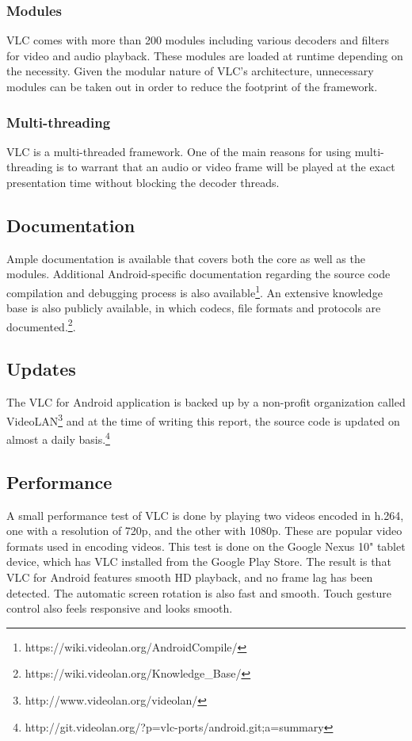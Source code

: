 \subsubsection{Modules}
VLC comes with more than 200 modules including various decoders and filters for video and audio playback. These modules are loaded at runtime depending on the necessity. Given the modular nature of VLC's architecture, unnecessary modules can be taken out in order to reduce the footprint of the framework.
\subsubsection{Multi-threading}
VLC is a multi-threaded framework. One of the main reasons for using multi-threading is to warrant that an audio or video frame will be played at the exact presentation time without blocking the decoder threads.
\subsection{Documentation}
Ample documentation is available that covers both the core as well as the modules. Additional Android-specific documentation regarding the source code compilation and debugging process is also available\footnote{https://wiki.videolan.org/AndroidCompile/}. An extensive knowledge base is also publicly available, in which codecs, file formats and protocols are documented.\footnote{https://wiki.videolan.org/Knowledge\_Base/}.
\subsection{Updates}
The VLC for Android application is backed up by a non-profit organization called VideoLAN\footnote{http://www.videolan.org/videolan/} and at the time of writing this report, the source code is updated on almost a daily basis.\footnote{http://git.videolan.org/?p=vlc-ports/android.git;a=summary}
\subsection{Performance}
\label{sec:VLC_performance}
A small performance test of VLC is done by playing two videos encoded in h.264, one with a resolution of 720p, and the other with 1080p. These are popular video formats used in encoding videos. This test is done on the Google Nexus 10" tablet device, which has VLC installed from the Google Play Store. The result is that VLC for Android features smooth HD playback, and no frame lag has been detected. The automatic screen rotation is also fast and smooth. Touch gesture control also feels responsive and looks smooth. 


